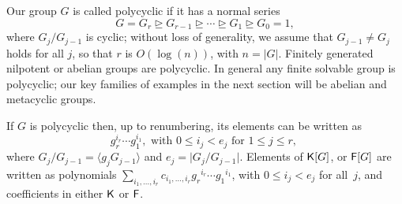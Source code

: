 Our group $G$ is called polycyclic if it has a normal series
$$G = G_{r} \unrhd G_{r-1} \unrhd \cdots \unrhd G_1 \unrhd G_{0} =
1,$$ where $G_{j}/G_{j-1}$ is cyclic; without loss of generality, we
assume that $G_{j-1 } \ne G_{j}$ holds for all $j$, so that $r$ is
$O(\log(n))$, with $n=|G|$. Finitely generated nilpotent or abelian
groups are polycyclic. In general any finite solvable group is
polycyclic; our key families of examples in the next section will be
abelian and metacyclic groups.

If $G$ is polycyclic then, up to renumbering, its 
elements can be written as
\[\label{eq:polycyclicgrp}
g_r^{i_r} \cdots g_1^{i_1}, \text{~with~} 0 \leq i_j < e_j
\text{~for~} 1 \leq j \leq r,\
\]
where $G_{j}/G_{j-1} = \langle g_{j}G_{j-1} \rangle$ and $e_j=\vert
G_{j}/G_{j-1}\vert$. Elements of ${\mathsf{K}}[G]$, or ${\mathsf{F}}[G]$ are written as
polynomials $\sum_{i_1,\dots,i_r} c_{i_1,\dots,i_r} {g_r}^{i_r} \cdots
{g_1}^{i_1}$, with $0\le i_j < e_j$ for all~$j$, and coefficients 
in either ${\mathsf{K}}$ or ${\mathsf{F}}$.



